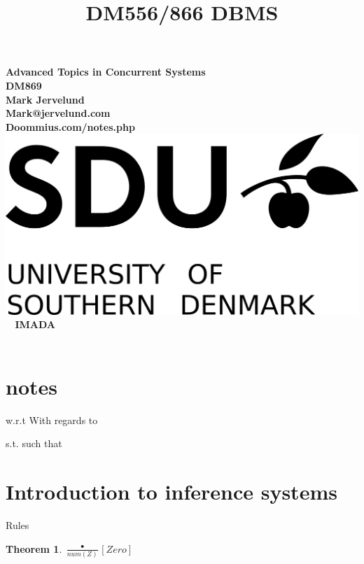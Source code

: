 \documentclass[a4paper,10pt,titlepage]{report}
\date{}
\title{DM556/866 DBMS}
\newtheorem{theorem}{Theorem}
\begin{document}
\begin{titlepage}
\centering
    \vspace*{9\baselineskip}
    \huge
    \bfseries
     Advanced Topics in Concurrent Systems \\ DM869 \\
    \normalfont 
    Mark Jervelund  \\
    Mark@jervelund.com\\
    Doommius.com/notes.php 	\\
    \vspace*{9\baselineskip}
    \normalfont
	\includegraphics[scale=1]{SDU_logo}
    \vfill\ 
    \vspace{5mm}
    IMADA \\

    \textbf{\datedate} \\[2\baselineskip]
\end{titlepage}

\renewcommand{\thepage}{\roman{page}}%
\tableofcontents
\newpage
\setcounter{page}{1}
\renewcommand{\thepage}{\arabic{page}}

\section{notes}

w.r.t With regards to

s.t. such that
\section{Introduction to inference systems}

Rules

\begin{theorem}

$\frac{•}{num(Z)}[Zero]$

\end{theorem}
\end{document}
